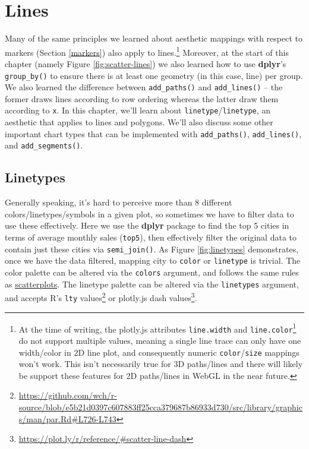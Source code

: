 \documentclass[
  12pt,
]{krantz}
\renewcommand{\href}[2]{#2\footnote{\url{#1}}}
\begin{document}
\hypertarget{lines}{%
\section{Lines}\label{lines}}

Many of the same principles we learned about aesthetic mappings with respect to markers (Section \ref{markers}) also apply to lines.\footnote{At the time of writing, the plotly.js attributes \href{https://github.com/plotly/plotly.js/issues/147}{\texttt{line.width} and \texttt{line.color}} do not support multiple values, meaning a single line trace can only have one width/color in 2D line plot, and consequently numeric \texttt{color}/\texttt{size} mappings won't work. This isn't necessarily true for 3D paths/lines and there will likely be support these features for 2D paths/lines in WebGL in the near future.} Moreover, at the start of this chapter (namely Figure \ref{fig:scatter-lines}) we also learned how to use \textbf{dplyr}'s \texttt{group\_by()} to ensure there is at least one geometry (in this case, line) per group. We also learned the difference between \texttt{add\_paths()} and \texttt{add\_lines()} -- the former draws lines according to row ordering whereas the latter draw them according to \texttt{x}. In this chapter, we'll learn about \texttt{linetype}/\texttt{linetype}, an aesthetic that applies to lines and polygons. We'll also discuss some other important chart types that can be implemented with \texttt{add\_paths()}, \texttt{add\_lines()}, and \texttt{add\_segments()}.

\hypertarget{linetypes}{%
\subsection{Linetypes}\label{linetypes}}

Generally speaking, it's hard to perceive more than 8 different colors/linetypes/symbols in a given plot, so sometimes we have to filter data to use these effectively. Here we use the \textbf{dplyr} package to find the top 5 cities in terms of average monthly sales (\texttt{top5}), then effectively filter the original data to contain just these cities via \texttt{semi\_join()}. As Figure \ref{fig:linetypes} demonstrates, once we have the data filtered, mapping city to \texttt{color} or \texttt{linetype} is trivial. The color palette can be altered via the \texttt{colors} argument, and follows the same rules as \protect\hyperlink{scatterplots}{scatterplots}. The linetype palette can be altered via the \texttt{linetypes} argument, and accepts R's \href{https://github.com/wch/r-source/blob/e5b21d0397c607883ff25cca379687b86933d730/src/library/graphics/man/par.Rd\#L726-L743}{\texttt{lty} values} or plotly.js \href{https://plot.ly/r/reference/\#scatter-line-dash}{dash values}.
\end{document}
